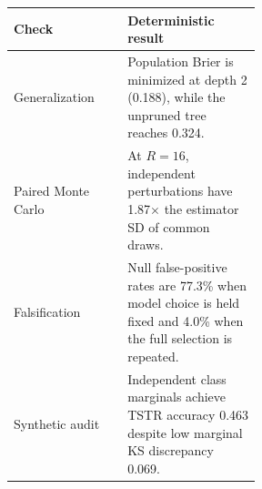 \begin{tabular}{lp{0.54\linewidth}}
\toprule
Check & Deterministic result \\
\midrule
Generalization & Population Brier is minimized at depth 2 (0.188), while the unpruned tree reaches 0.324. \\
Paired Monte Carlo & At $R=16$, independent perturbations have 1.87$\times$ the estimator SD of common draws. \\
Falsification & Null false-positive rates are 77.3\% when model choice is held fixed and 4.0\% when the full selection is repeated. \\
Synthetic audit & Independent class marginals achieve TSTR accuracy 0.463 despite low marginal KS discrepancy 0.069. \\
\bottomrule
\end{tabular}
